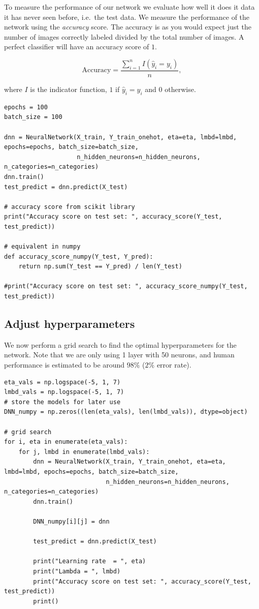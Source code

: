 \documentclass[%
oneside,                 %
final,                   %
10pt]{article}
\begin{document}
To measure the performance of our network we evaluate how well it does it data it has never seen before, i.e.~the test data.  
We measure the performance of the network using the \emph{accuracy} score.  
The accuracy is as you would expect just the number of images correctly labeled divided by the total number of images. A perfect classifier will have an accuracy score of $1$.  

$$ \text{Accuracy} = \frac{\sum_{i=1}^n I(\hat{y}_i = y_i)}{n} ,$$  

where $I$ is the indicator function, $1$ if $\hat{y}_i = y_i$ and $0$ otherwise.


\begin{verbatim}
epochs = 100
batch_size = 100

dnn = NeuralNetwork(X_train, Y_train_onehot, eta=eta, lmbd=lmbd, epochs=epochs, batch_size=batch_size,
                    n_hidden_neurons=n_hidden_neurons, n_categories=n_categories)
dnn.train()
test_predict = dnn.predict(X_test)

# accuracy score from scikit library
print("Accuracy score on test set: ", accuracy_score(Y_test, test_predict))

# equivalent in numpy
def accuracy_score_numpy(Y_test, Y_pred):
    return np.sum(Y_test == Y_pred) / len(Y_test)

#print("Accuracy score on test set: ", accuracy_score_numpy(Y_test, test_predict))
\end{verbatim}

\subsection*{Adjust hyperparameters}

We now perform a grid search to find the optimal hyperparameters for the network.  
Note that we are only using 1 layer with 50 neurons, and human performance is estimated to be around $98\%$ ($2\%$ error rate).

\begin{verbatim}
eta_vals = np.logspace(-5, 1, 7)
lmbd_vals = np.logspace(-5, 1, 7)
# store the models for later use
DNN_numpy = np.zeros((len(eta_vals), len(lmbd_vals)), dtype=object)

# grid search
for i, eta in enumerate(eta_vals):
    for j, lmbd in enumerate(lmbd_vals):
        dnn = NeuralNetwork(X_train, Y_train_onehot, eta=eta, lmbd=lmbd, epochs=epochs, batch_size=batch_size,
                            n_hidden_neurons=n_hidden_neurons, n_categories=n_categories)
        dnn.train()
        
        DNN_numpy[i][j] = dnn
        
        test_predict = dnn.predict(X_test)
        
        print("Learning rate  = ", eta)
        print("Lambda = ", lmbd)
        print("Accuracy score on test set: ", accuracy_score(Y_test, test_predict))
        print()
\end{verbatim}
\end{document}
